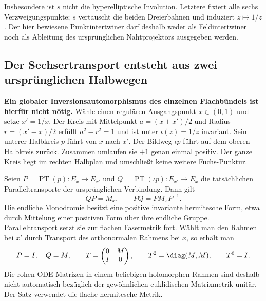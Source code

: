 
Insbesondere ist $s$ nicht die hyperelliptische Involution. Letztere fixiert alle sechs Verzweigungspunkte; $s$ vertauscht die beiden Dreierbahnen und induziert $z\mapsto1/z$. Der hier bewiesene Punktintertwiner darf deshalb weder als Feldintertwiner noch als Ableitung des ursprünglichen Nahtprojektors ausgegeben werden.

\subsection{Der Sechsertransport entsteht aus zwei ursprünglichen Halbwegen}\label{sec:pathclock}
\textbf{Ein globaler Inversionsautomorphismus des einzelnen Flachbündels ist hierfür nicht nötig.}
Wähle einen regulären Ausgangspunkt $x\in(0,1)$ und setze $x'=1/x$.
Der Kreis mit Mittelpunkt $a=(x+x')/2$ und Radius $r=(x'-x)/2$ erfüllt
$a^2-r^2=1$ und ist unter $\iota(z)=1/z$ invariant. Sein unterer Halbkreis $p$ führt von $x$ nach $x'$. Der Bildweg $\iota p$ führt auf dem oberen Halbkreis zurück. Zusammen umlaufen sie $+1$ genau einmal positiv. Der ganze Kreis liegt im rechten Halbplan und umschließt keine weitere Fuchs-Punktur.

Seien $P=\operatorname{PT}(p):E_x\to E_{x'}$ und
$Q=\operatorname{PT}(\iota p):E_{x'}\to E_x$ die tatsächlichen Paralleltransporte der ursprünglichen Verbindung. Dann gilt
\begin{equation}
QP=M_x,\qquad PQ=PM_xP^{-1}.
\end{equation}
Die endliche Monodromie besitzt eine positive invariante hermitesche Form, etwa durch Mittelung einer positiven Form über ihre endliche Gruppe. Paralleltransport setzt sie zur flachen Fasermetrik fort. Wählt man den Rahmen bei $x'$ durch Transport des orthonormalen Rahmens bei $x$, so erhält man
\begin{equation}\label{eq:pathT}
P=I,\quad Q=M,\qquad
T=\begin{pmatrix}0&M\\I&0\end{pmatrix},\qquad
T^2=\diag(M,M),\qquad T^6=I.
\end{equation}
Die rohen ODE-Matrizen in einem beliebigen holomorphen Rahmen sind deshalb nicht automatisch bezüglich der gewöhnlichen euklidischen Matrixmetrik unitär. Der Satz verwendet die flache hermitesche Metrik.

